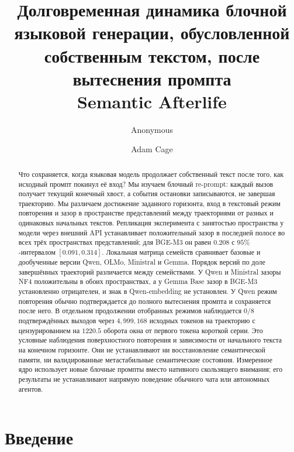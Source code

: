 \documentclass[10pt]{article}
\title{Долговременная динамика блочной языковой генерации, обусловленной собственным текстом, после вытеснения промпта\\
\large Semantic Afterlife}
\author{Anonymous}
\author{Adam Cage}
\date{}
\begin{document}
\maketitle

\begin{abstract}
Что сохраняется, когда языковая модель продолжает собственный текст после того,
как исходный промпт покинул её вход? Мы изучаем блочный re-prompt:
каждый вызов получает текущий конечный хвост, а события остановки
записываются, не завершая траекторию. Мы различаем достижение заданного
горизонта, вход в текстовый режим повторения и зазор в пространстве
представлений между траекториями от разных и одинаковых начальных текстов.
Репликация эксперимента с занятостью пространства у модели через внешний API
устанавливает положительный зазор в последней полосе во всех трёх пространствах
представлений; для BGE-M3 он равен $0.208$ с $95\%$-интервалом
$[0.091, 0.314]$. %
Локальная матрица семейств сравнивает базовые и дообученные версии
Qwen, OLMo, Ministral и Gemma. Порядок версий по доле завершённых
траекторий различается между семействами.
У Qwen и Ministral зазоры NF4 положительны в обоих пространствах,
а у Gemma Base зазор в BGE-M3 установленно отрицателен,
и знак в Qwen-embedding не установлен. %
У Qwen режим повторения обычно подтверждается до полного вытеснения промпта
и сохраняется после него. В отдельном продолжении отобранных режимов
наблюдается $0/8$ подтверждённых выходов через $4{,}999{,}168$ исходных
токенов на траекторию с цензурированием на $1220.5$ оборота окна от первого
токена короткой серии. %
Это условные наблюдения поверхностного повторения и зависимости от начального
текста на конечном горизонте. Они не устанавливают ни восстановление
семантической памяти, ни валидированные метастабильные семантические состояния.
Измеренное ядро использует новые блочные промпты вместо нативного скользящего
внимания; его результаты не устанавливают напрямую поведение обычного чата
или автономных агентов.
\end{abstract}

\section{Введение}
\label{sec:intro}
\end{document}
